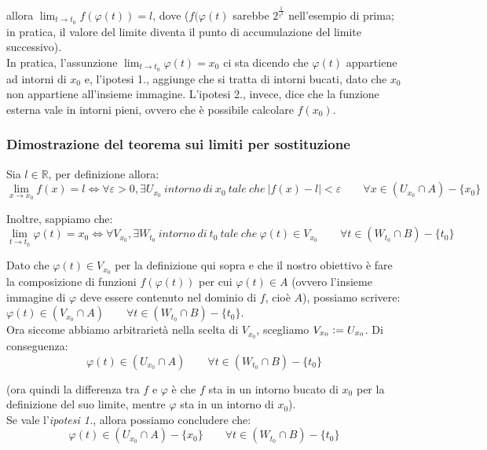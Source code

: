 \documentclass{article}
\begin{document}
\noindent allora $\lim_{t \to t_0} f(\varphi(t)) = l$, dove ($f(\varphi(t)$ sarebbe $2^\frac{1}{t^2}$ nell'esempio di prima; in pratica, il valore del limite diventa il punto di accumulazione del limite successivo). \\
In pratica, l'assunzione $\lim_{t \to t_0} \varphi(t) = x_0$ ci sta dicendo che $\varphi(t)$ appartiene ad intorni di $x_0$ e, l'ipotesi 1., aggiunge che si tratta di intorni bucati, dato che $x_0$ non appartiene all'insieme immagine. L'ipotesi 2., invece, dice che la funzione esterna vale in intorni pieni, ovvero che è possibile calcolare $f(x_0)$.

\subsubsection{Dimostrazione del teorema sui limiti per sostituzione}
Sia $l \in \mathbb{R}$, per definizione allora:
\begin{equation*}
    \lim_{x \to x_0} f(x) = l \iff \forall \varepsilon > 0, \exists U_{x_0} \ intorno \ di \ x_0 \ tale \ che \ |f(x) - l| < \varepsilon \qquad \forall x \in (U_{x_0} \cap A) - \{x_0\}
\end{equation*}

\noindent Inoltre, sappiamo che:
\begin{equation*}
    \lim_{t \to t_0} \varphi(t) = x_0 \iff \forall V_{x_0}, \exists W_{t_0} \ intorno \ di \ t_0 \ tale \ che \ \varphi(t) \in V_{x_0} \qquad \forall t \in (W_{t_0} \cap B) - \{t_0\}
\end{equation*}

\noindent Dato che $\varphi(t) \in V_{x_0}$ per la definizione qui sopra e che il nostro obiettivo è fare la composizione di funzioni $f(\varphi(t))$ per cui $\varphi(t) \in A$ (ovvero l'insieme immagine di $\varphi$ deve essere contenuto nel dominio di $f$, cioè $A$), possiamo scrivere: $\varphi(t) \in (V_{x_0} \cap A) \qquad \forall t \in (W_{t_0} \cap B) - \{t_0\}$.\\
Ora siccome abbiamo arbitrarietà nella scelta di $V_{x_0}$, scegliamo $V_{x_0} \vcentcolon = U_{x_0}$. Di conseguenza:
\begin{equation*}
    \varphi(t) \in (U_{x_0} \cap A) \qquad \forall t \in (W_{t_0} \cap B) - \{t_0\}
\end{equation*}

\noindent (ora quindi la differenza tra $f$ e $\varphi$ è che $f$ sta in un intorno bucato di $x_0$ per la definizione del suo limite, mentre $\varphi$ sta in un intorno di $x_0$).\\
Se vale l'\textit{ipotesi 1.}, allora possiamo concludere che:
\begin{equation*}
    \varphi(t) \in (U_{x_0} \cap A) - \{x_0\} \qquad \forall t \in (W_{t_0} \cap B) - \{t_0\}
\end{equation*}
\end{document}
